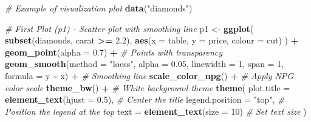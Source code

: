\documentclass[
  12pt,
]{article}
\newenvironment{Shaded}{\begin{snugshade}}{\end{snugshade}}
\newcommand{\AttributeTok}[1]{\textcolor[rgb]{0.13,0.29,0.53}{#1}}
\newcommand{\CommentTok}[1]{\textcolor[rgb]{0.56,0.35,0.01}{\textit{#1}}}
\newcommand{\DecValTok}[1]{\textcolor[rgb]{0.00,0.00,0.81}{#1}}
\newcommand{\FloatTok}[1]{\textcolor[rgb]{0.00,0.00,0.81}{#1}}
\newcommand{\FunctionTok}[1]{\textcolor[rgb]{0.13,0.29,0.53}{\textbf{#1}}}
\newcommand{\NormalTok}[1]{#1}
\newcommand{\OtherTok}[1]{\textcolor[rgb]{0.56,0.35,0.01}{#1}}
\newcommand{\SpecialCharTok}[1]{\textcolor[rgb]{0.81,0.36,0.00}{\textbf{#1}}}
\newcommand{\StringTok}[1]{\textcolor[rgb]{0.31,0.60,0.02}{#1}}
\begin{document}
\begin{Shaded}
\begin{Highlighting}[]
\CommentTok{\# Example of visualization plot}
\FunctionTok{data}\NormalTok{(}\StringTok{"diamonds"}\NormalTok{)}

\CommentTok{\# First Plot (p1) {-} Scatter plot with smoothing line}
\NormalTok{p1 }\OtherTok{\textless{}{-}} \FunctionTok{ggplot}\NormalTok{(}
  \FunctionTok{subset}\NormalTok{(diamonds, carat }\SpecialCharTok{\textgreater{}=} \FloatTok{2.2}\NormalTok{),}
  \FunctionTok{aes}\NormalTok{(}\AttributeTok{x =}\NormalTok{ table, }\AttributeTok{y =}\NormalTok{ price, }\AttributeTok{colour =}\NormalTok{ cut)}
\NormalTok{) }\SpecialCharTok{+}
  \FunctionTok{geom\_point}\NormalTok{(}\AttributeTok{alpha =} \FloatTok{0.7}\NormalTok{) }\SpecialCharTok{+}  \CommentTok{\# Points with transparency}
  \FunctionTok{geom\_smooth}\NormalTok{(}\AttributeTok{method =} \StringTok{"loess"}\NormalTok{, }\AttributeTok{alpha =} \FloatTok{0.05}\NormalTok{, }\AttributeTok{linewidth =} \DecValTok{1}\NormalTok{, }\AttributeTok{span =} \DecValTok{1}\NormalTok{, }\AttributeTok{formula =}\NormalTok{ y }\SpecialCharTok{\textasciitilde{}}\NormalTok{ x) }\SpecialCharTok{+}  \CommentTok{\# Smoothing line}
  \FunctionTok{scale\_color\_npg}\NormalTok{() }\SpecialCharTok{+}  \CommentTok{\# Apply NPG color scale}
  \FunctionTok{theme\_bw}\NormalTok{() }\SpecialCharTok{+}  \CommentTok{\# White background theme}
  \FunctionTok{theme}\NormalTok{(}
    \AttributeTok{plot.title =} \FunctionTok{element\_text}\NormalTok{(}\AttributeTok{hjust =} \FloatTok{0.5}\NormalTok{),  }\CommentTok{\# Center the title}
    \AttributeTok{legend.position =} \StringTok{"top"}\NormalTok{,  }\CommentTok{\# Position the legend at the top}
    \AttributeTok{text =} \FunctionTok{element\_text}\NormalTok{(}\AttributeTok{size =} \DecValTok{10}\NormalTok{)  }\CommentTok{\# Set text size}
\NormalTok{  )}


\end{Highlighting}
\end{Shaded}
\end{document}
